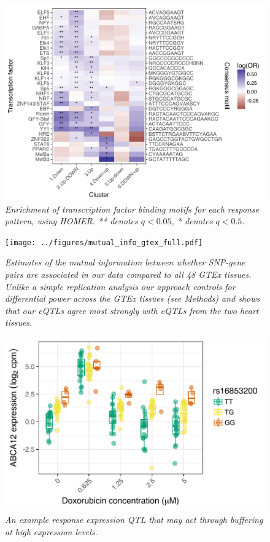 \documentclass{article}
\begin{document}
\begin{figure}[h]
\begin{center}
    \includegraphics[width=1\textwidth]{../figures/cluster_tf.pdf} %
    \caption{\it{Enrichment of transcription factor binding motifs for each response pattern, using HOMER. ** denotes $q<0.05$, * denotes $q<0.5$.}}
    \label{fig:tf}
    \end{center}
\end{figure}

\begin{figure}[h]
\begin{center}
    \texttt{[image: ../figures/mutual\_info\_gtex\_full.pdf]} 
    \caption{\it{Estimates of the mutual information between whether SNP-gene pairs are associated in our data compared to all 48 GTEx tissues. Unlike a simple replication analysis our approach controls for differential power across the GTEx tissues (see Methods) and shows that our eQTLs agree most strongly with eQTLs from the two heart tissues.}}
    \label{fig:gtex_mi}
    \end{center}
\end{figure}

\begin{figure}[h]
\begin{center}
    \includegraphics[width=.6\textwidth]{../figures/ABCA12.pdf} %
    \caption{\it{An example response expression QTL that may act through buffering at high expression levels.}}
    \label{fig:ABCA12}
    \end{center}
\end{figure}
\end{document}
